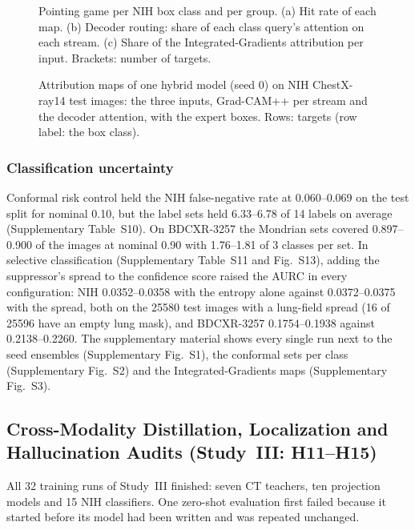 \begin{figure}[!t]
\centering
{}
\caption{Pointing game per NIH box class and per group. (a) Hit rate of each map. (b) Decoder routing: share of each class query's
attention on each stream. (c) Share of the Integrated-Gradients attribution per input. Brackets: number of targets.}
\label{fig:cls_pointing}
\end{figure}

\begin{figure}[!t]
\centering
{}
\caption{Attribution maps of one hybrid model (seed 0) on NIH ChestX-ray14 test images: the three inputs, Grad-CAM++ per stream and the
decoder attention, with the expert boxes. Rows: targets (row label: the box class).}
\label{fig:cls_maps}
\end{figure}

\subsubsection{Classification uncertainty}
Conformal risk control held the NIH false-negative rate at 0.060--0.069 on the test split for nominal 0.10, but the label sets held
6.33--6.78 of 14 labels on average (Supplementary Table~S10). On BDCXR-3257 the Mondrian sets covered 0.897--0.900 of the images at nominal
0.90 with 1.76--1.81 of 3 classes per set. In selective classification (Supplementary Table~S11 and Fig.~S13), adding the suppressor's
spread to the confidence score raised the AURC in every configuration: NIH 0.0352--0.0358 with the entropy alone against 0.0372--0.0375 with
the spread, both on the \num{25580} test images with a lung-field spread (16 of \num{25596} have an empty lung mask), and BDCXR-3257
0.1754--0.1938 against 0.2138--0.2260. The supplementary material shows every single run next to the seed ensembles (Supplementary
Fig.~S1), the conformal sets per class (Supplementary Fig.~S2) and the Integrated-Gradients maps (Supplementary Fig.~S3).

\subsection{Cross-Modality Distillation, Localization and Hallucination Audits (Study~III: H11--H15)}
\label{sec:res-xm}
All 32 training runs of Study~III finished: seven CT teachers, ten projection models and 15 NIH classifiers. One zero-shot evaluation first
failed because it started before its model had been written and was repeated unchanged.

